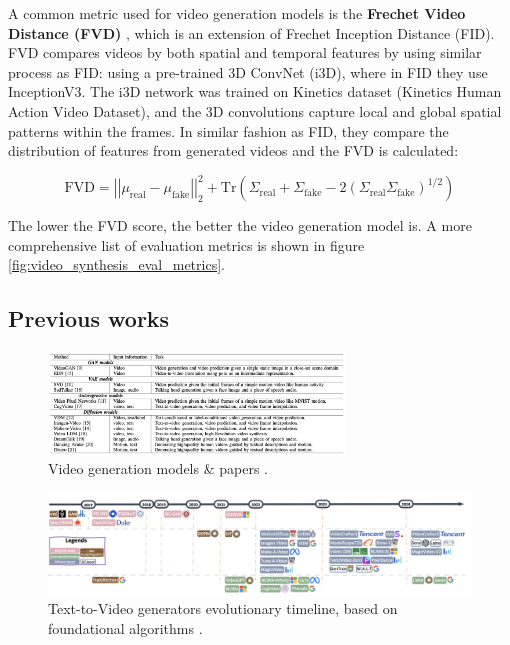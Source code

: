 A common metric used for video generation models is the \textbf{Frechet Video Distance (FVD)} \cite{fvd}, which is an extension of Frechet Inception Distance (FID). FVD compares videos by both spatial and temporal features by using similar process as FID: using a pre-trained 3D ConvNet (i3D), where in FID they use InceptionV3. The i3D network was trained on Kinetics dataset (Kinetics Human Action Video Dataset), and the 3D convolutions capture local and global spatial patterns within the frames. In similar fashion as FID, they compare the distribution of features from generated videos and the FVD is calculated:

\begin{equation*}
    \text{FVD} = \left| \left| \mu_{\text{real}} - \mu_{\text{fake}} \right| \right|^2_2 + \text{Tr} \left( \Sigma_{\text{real}} + \Sigma_{\text{fake}} - 2 \left( \Sigma_{\text{real}} \Sigma_{\text{fake}} \right)^{1/2} \right)
\end{equation*}

The lower the FVD score, the better the video generation model is. A more comprehensive list of evaluation metrics is shown in figure \ref{fig:video_synthesis_eval_metrics}.





\subsection{Previous works}

\begin{figure}
    \centering
    \includegraphics[width=0.7\textwidth]{images/video_synthesis/previous_works.png}
    \caption{Video generation models \& papers \cite{zhou2024survey}.}
\end{figure}

\begin{figure}
    \centering
    \includegraphics[width=1\textwidth]{images/video_synthesis/timeline.png}
    \caption{Text-to-Video generators evolutionary timeline, based on foundational algorithms \cite{sun2024sora}.}
\end{figure}

